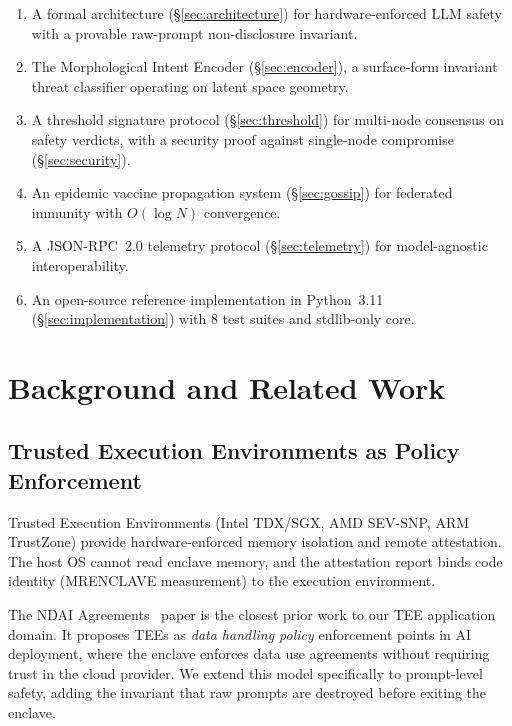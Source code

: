 \documentclass[sigconf,natbib=false]{acmart}
\begin{document}
\begin{enumerate}
\item A formal architecture (\S\ref{sec:architecture}) for hardware-enforced
LLM safety with a provable raw-prompt non-disclosure invariant.
\item The Morphological Intent Encoder (\S\ref{sec:encoder}), a surface-form
invariant threat classifier operating on latent space geometry.
\item A threshold signature protocol (\S\ref{sec:threshold}) for
multi-node consensus on safety verdicts, with a security proof
against single-node compromise (\S\ref{sec:security}).
\item An epidemic vaccine propagation system (\S\ref{sec:gossip}) for
federated immunity with $O(\log N)$ convergence.
\item A JSON-RPC~2.0 telemetry protocol (\S\ref{sec:telemetry}) for
model-agnostic interoperability.
\item An open-source reference implementation in Python~3.11
(\S\ref{sec:implementation}) with 8 test suites and stdlib-only core.
\end{enumerate}

\section{Background and Related Work}
\label{sec:background}

\subsection{Trusted Execution Environments as Policy Enforcement}
\label{sec:bg:tee}

Trusted Execution Environments (Intel TDX/SGX, AMD SEV-SNP, ARM TrustZone)
provide hardware-enforced memory isolation and remote attestation. The host
OS cannot read enclave memory, and the attestation report binds code identity
(MRENCLAVE measurement) to the execution environment.

The NDAI Agreements~\cite{ndai2024tee} paper is the closest prior work to our
TEE application domain. It proposes TEEs as \emph{data handling policy}
enforcement points in AI deployment, where the enclave enforces data use
agreements without requiring trust in the cloud provider. We extend this
model specifically to prompt-level safety, adding the invariant that
raw prompts are destroyed before exiting the enclave.
\end{document}
